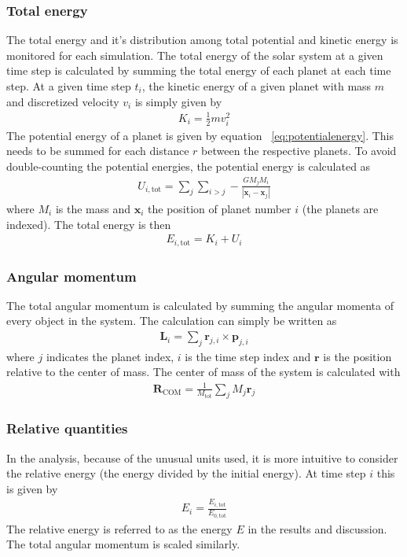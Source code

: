 \documentclass[aps,reprint]{revtex4-1}
\begin{document}
\subsubsection{Total energy}
The total energy and it's distribution among total potential and kinetic energy
is monitored for each simulation. The total energy of the solar system at a given time step is
calculated by summing the total energy of each planet at each time step.
At a given time step $t_i$, the kinetic energy of a given planet with mass $m$
and discretized velocity $v_i$ is simply given by
\begin{align}
  K_i = \frac{1}{2} m v_i^2
\end{align}
The potential energy of a planet is given by equation ~\ref{eq:potentialenergy}.
This needs to be summed for each distance $r$ between the respective planets. To
avoid double-counting the potential energies, the potential energy is calculated
as
\begin{align}
  U_{i, \text{tot}} = \sum_j \sum_{i > j} - \frac{G M_j M_i}{|\mathbf{x}_i - \mathbf{x}_j|}
\end{align}
where $M_i$ is the mass and $\mathbf{x}_i$ the position of planet number $i$
(the planets are indexed). The total energy is then
\begin{align}
  E_{i,\text{tot}} = K_i + U_i
\end{align}
\subsubsection{Angular momentum}
The total angular momentum is calculated by summing the angular momenta of
every object in the system. The calculation can simply be written as
\begin{align}
  \mathbf{L}_i = \sum_j \mathbf{r}_{j,i} \times \mathbf{p}_{j,i}
\end{align}
where $j$ indicates the planet index, $i$ is the time step index and $\mathbf{r}$ is the
position relative to the center of mass. The center of mass of the system
is calculated with
\begin{align}
  \mathbf{R}_\text{COM} = \frac{1}{M_\text{tot}} \sum_j M_j \mathbf{r}_j
\end{align}
\subsubsection{Relative quantities}
In the analysis, because of the unusual units used, it is more intuitive to
consider the relative energy (the energy divided by the initial energy). At time step $i$
this is given by
\begin{align}
  E_i = \frac{E_{i,\text{tot}}}{E_{0,\text{tot}}}
\end{align}
The relative energy is referred to as the energy $E$ in the results and
discussion. The total angular momentum is scaled similarly.
\end{document}
